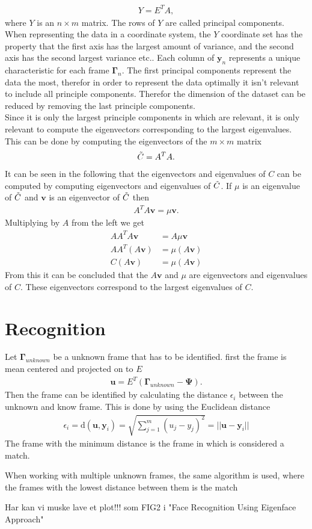 \begin{align*}
    Y=E^TA,
\end{align*}
where $Y$ is an $n\times m$ matrix. The rows of $Y$ are called principal components. When representing the data in a coordinate system, the $Y$ coordinate set has the property that the first axis has the largest amount of variance, and the second axis has the second largest variance etc.. Each column of $\textbf{y}_n$ represents a unique characteristic for each frame $\mathbf{\Gamma}_n$. The first principal components represent the data the most, therefor in order to represent the data optimally it isn't relevant to include all principle components. Therefor the dimension of the dataset can be reduced by removing the last principle components.\\
Since it is only the largest principle components in which are relevant, it is only relevant to compute the eigenvectors corresponding to the largest eigenvalues.
This can be done by computing the eigenvectors of the $m\times m$ matrix 
\begin{align*}
    \Tilde{C}=A^TA.
\end{align*}
It can be seen in the following that the eigenvectors and eigenvalues of $C$ can be computed by computing eigenvectors and eigenvalues of $\Tilde{C}$. If $\mu$ is an eigenvalue of $\Tilde{C}$ and $\textbf{v}$ is an eigenvector of $\Tilde{C}$ then
\begin{align*}
    A^TA\textbf{v}=\mu \textbf{v}.
\end{align*}
Multiplying by $A$ from the left we get
\begin{align*}
    AA^TA\textbf{v}&=A\mu \textbf{v}\\
    AA^T(A\textbf{v})&=\mu (A \textbf{v})\\
    C(A\textbf{v})&=\mu (A \textbf{v})
\end{align*}
From this it can be concluded that the $A\textbf{v}$ and $\mu$ are eigenvectors and eigenvalues of $C$. These eigenvectors correspond to the largest eigenvalues of $C$.

\section{Recognition}
Let $\mathbf{\Gamma}_{unknown}$ be a unknown frame that has to be identified. first the frame is mean centered and projected on to $E$  
\begin{align*}
    \mathbf{u}=E^T(\mathbf{\Gamma}_{unknown}-\mathbf{\Psi}).
\end{align*}
Then the frame can be identified by calculating the distance $\epsilon_i$ between the unknown and know frame. This is done by using the Euclidean distance
\begin{align*}
\epsilon_i=\text{d}(\textbf{u},\textbf{y}_i)=\sqrt{\sum_{j=1}^m(u_j-y_j)^2}=||\textbf{u}-\textbf{y}_i||
\end{align*}
The frame with the minimum distance is the frame in which is considered a match.

When working with multiple unknown frames, the same algorithm is used, where the frames with the lowest distance between them is the match

 
Har kan vi muske lave et plot!!!  som FIG2 i "Face Recognition Using Eigenface Approach"


